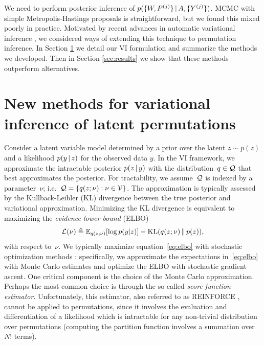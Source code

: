 \documentclass{article}
\begin{document}
We need to perform posterior inference of $p(\{W,P^{(j)}\} \, | \, A, \{Y^{(j)}\})$.
MCMC with simple Metropolis-Hastings proposals is straightforward, but
we found this mixed poorly in practice. Motivated by recent advances
in automatic variational inference \citep{Blei2017}, we considered
ways of extending this technique to permutation inference.  In Section
\ref{sec:VI} we detail our VI formulation and summarize the methods we
developed. Then in Section \ref{sec:results} we show that these
methods outperform alternatives.

\section{New methods for variational inference of latent permutations}
\label{sec:VI}
Consider a latent variable model determined by a prior over the latent
$z \sim p(z)$ and a likelihood $p(y \, | \, z)$ for the observed data $y$. In
the VI framework, we approximate the intractable 
posterior $p(z \, | \, y)$ with the distribution~$q \in \mathcal{Q}$
that best approximates the posterior. For tractability, we assume~$\mathcal{Q}$ 
is indexed by a parameter~$\nu$; i.e.~$\mathcal{Q} = \{q(z; \nu): \nu \in \mathcal{V}\}$.
The approximation is typically assessed by the Kullback-Leibler (KL) divergence between the true posterior and variational approximation.
Minimizing the KL divergence is equivalent to maximizing the \emph{evidence lower bound} (ELBO)
\begin{align}
  \label{eq:elbo}
  \mathcal{L}(\nu) \triangleq  \mathbb{E}_{q(z;\nu)}[\log p(y|z)]
  - \mathrm{KL}(q(z;\nu)\, \| \,  p(z)),
\end{align}
with respect to~$\nu$.  We typically maximize equation~\eqref{eq:elbo}
with stochastic optimization methods \citep{Kushner1987}:
specifically, we approximate the expectations in~\eqref{eq:elbo} with
Monte Carlo estimates and optimize the ELBO with stochastic gradient
ascent. One critical component is the choice of the Monte Carlo
approximation. Perhaps the most common choice is through the so called
\emph{score function estimator}. Unfortunately,
this estimator, also referred to as REINFORCE \citep{Williams1992},
cannot be applied to permutations, since it involves the evaluation
and differentiation of a likelihood which is intractable for any
non-trivial distribution over permutations (computing the partition
function involves a summation over~$N!$ terms).
 
\end{document}
